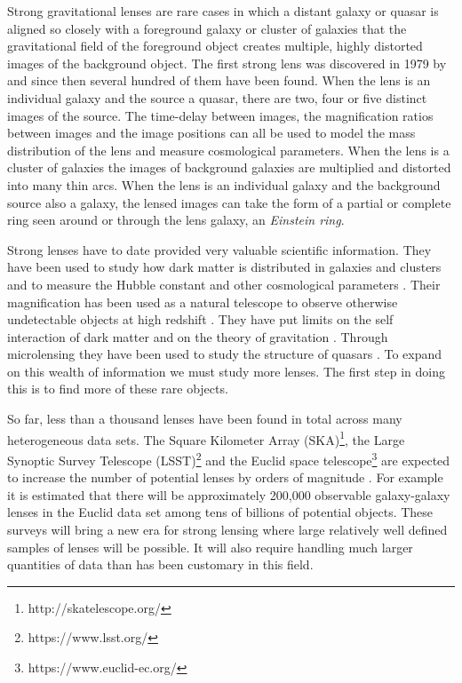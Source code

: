\documentclass{aa}
\begin{document}
Strong gravitational lenses are rare cases in which a distant galaxy or quasar is aligned so closely with a foreground galaxy or cluster of galaxies  that the gravitational field of the foreground object creates multiple, highly distorted images of the background object.   The first strong lens was discovered in 1979 by \citet{1979Natur.279..381W} and since then several hundred of them have been found.
When the lens is an individual galaxy and the source a quasar, there are two, four or five distinct images of the source.  The time-delay between images,  the magnification ratios between images and the image positions can all be used to model the mass distribution of the lens and measure cosmological parameters.  When the lens is a cluster of galaxies the images of background galaxies are multiplied and distorted into many thin arcs.   When the lens is an individual galaxy and the background source also a galaxy, the lensed images can take the form of a partial or complete ring seen around or through the lens galaxy, an {\it Einstein ring}.   

Strong lenses have to date provided very valuable scientific information.  They have been used to study how dark matter is distributed in galaxies and clusters \citep[e.g.][]{1991ApJ...373..354K,2001ApJ...554.1216C,2002ApJ...568L...5K,2003ApJ...587..143R,2003ApJ...583..606K,2005MNRAS.360.1333W,2005ApJ...623...31D,2009MNRAS.392..945V,2016MNRAS.463.3115T} and  to measure the Hubble constant and other cosmological parameters 
\citep[e.g.][]{1964MNRAS.128..307R,1992ARAandA..30..311B,2000ApJ...544...98W,2013ApJ...766...70S,2016AandARv..24...11T}.  
Their magnification has been used as a natural telescope to observe otherwise undetectable objects at high redshift \citep[e.g.][]{2007ApJ...671.1196M,2017MNRAS.464.4823B,2016ApJ...833..264S}.   They have put limits on the self interaction of dark matter and on the theory of gravitation \citep{0004-637X-606-2-819}.  Through microlensing they have been used to study the structure of quasars \citep{2008ApJ...689..755M,2008ApJ...673...34P,2011ApJ...729...34B}.   To expand on this wealth of information we must study more lenses.  The first step in doing this is to find more of these rare objects.

So far, less than a thousand lenses have been found in total across many heterogeneous data sets.
The Square Kilometer Array (SKA)\footnote{http://skatelescope.org/}, the Large Synoptic Survey Telescope (LSST)\footnote{https://www.lsst.org/} and the Euclid space telescope\footnote{https://www.euclid-ec.org/} are expected to increase the number of potential lenses by orders of magnitude \citep{2010MNRAS.405.2579O,collett_15,euclidSLWGwhitepaper,2015aska.confE..84M}.   For example it is estimated that there will be approximately 200,000 observable galaxy-galaxy lenses in the Euclid data set among tens of billions of potential objects.   These surveys will bring a new era for strong lensing where large relatively well defined samples of lenses will be possible.  It will also require handling much larger quantities of data than has been customary in this field.
\end{document}
